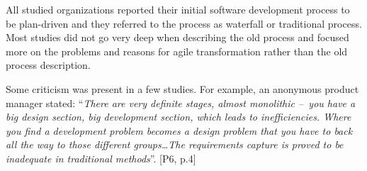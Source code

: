 All studied organizations reported their initial software development
process to be plan-driven and they referred to the process as waterfall
or traditional process. Most studies did not go very deep when
describing the old process and focused more on the problems and reasons
for agile transformation rather than the old process description.

Some criticism was present in a few studies. For example, an anonymous
product manager stated: ``\textit{There are very definite stages, almost
monolithic – you have a big design section, big development section,
which leads to inefficiencies. Where you find a development problem
becomes a design problem that you have to back all the way to those
different groups\ldots The requirements capture is proved to be inadequate
in traditional methods}''. [P6, p.4]
